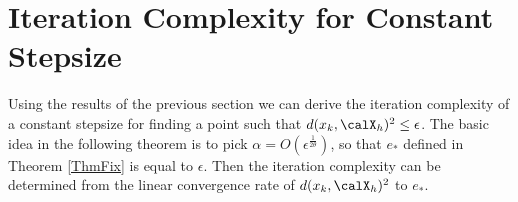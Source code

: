 \documentclass[smallextended]{svjour3}
\begin{document}
 

 
 
 \section{Iteration Complexity for Constant Stepsize}\label{sec_itercomp}
 Using the results of the previous section we can derive the iteration complexity of a constant stepsize for finding a point such that $d(x_k,\calX_h)^2\leq\epsilon$. 
   The basic idea in the following theorem is to pick $\alpha=O(\epsilon^{\frac{1}{2\theta}})$, so that $e_*$ defined in Theorem \ref{ThmFix} is equal to $\epsilon$. Then the iteration complexity can be determined from the linear convergence rate of $d(x_k,\calX_h)^2$ to $e_*$.


  
\end{document}
